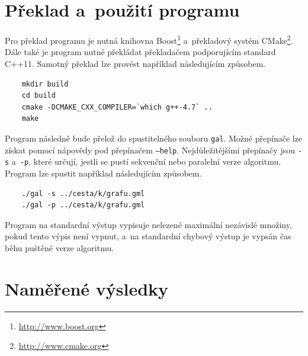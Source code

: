 \documentclass[12pt]{article}
\begin{document}
\appendix
\section{Překlad a~použití programu} \label{appendix:ProgramUsage}
Pro překlad programu je nutná knihovna Boost\footnote{\url{http://www.boost.org}} a~překladový systém CMake\footnote{\url{http://www.cmake.org}}. Dále také je program nutné překládat překladačem podporujícím standard C++11. Samotný překlad lze provést například následujícím způsobem.
\begin{verbatim}
    mkdir build
    cd build
    cmake -DCMAKE_CXX_COMPILER=`which g++-4.7` ..
    make
\end{verbatim}

Program následně bude přelož do spustitelného souboru \texttt{gal}. Možné přepínače lze získat pomocí nápovědy pod přepínačem \texttt{--help}. Nejdůležitějšími přepínačy jsou \texttt{-s} a~\texttt{-p}, které určují, jestli se pustí sekvenční nebo paralelní verze algoritmu. Program lze spustit například následujícím způsobem.
\begin{verbatim}
    ./gal -s ../cesta/k/grafu.gml
    ./gal -p ../cesta/k/grafu.gml
\end{verbatim}

Program na standardní výstup vypisuje nelezené maximální nezávislé množiny, pokud tento výpis není vypnut, a~na standardní chybový výstup je vypsán čas běhu puštěné verze algoritmu. 

\section{Naměřené výsledky} \label{appendix:RawResults}
\end{document}
